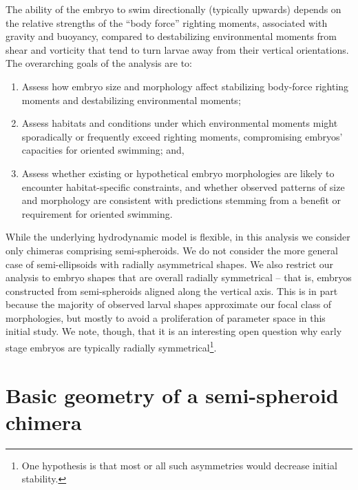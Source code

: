 \documentclass[10pt,a4paper]{article}
\begin{document}
The ability of the embryo to swim directionally (typically upwards) depends on the relative strengths of the ``body force'' righting moments, associated with gravity and buoyancy, compared to destabilizing environmental moments from shear and vorticity that tend to turn larvae away from their vertical orientations.
The overarching goals of the analysis are to:
\begin{enumerate}
	\item Assess how embryo size and morphology affect stabilizing body-force righting moments and destabilizing environmental moments; 
	\item Assess habitats and conditions under which environmental moments might sporadically or frequently exceed righting moments, compromising embryos' capacities for oriented swimming; and, 
	\item Assess whether existing or hypothetical embryo morphologies are likely to encounter habitat-specific constraints, and whether observed patterns of size and morphology are consistent with predictions stemming from a benefit or requirement for oriented swimming.
\end{enumerate}
While the underlying hydrodynamic model is flexible, in this analysis we consider only chimeras comprising semi-spheroids.
We do not consider the more general case of semi-ellipsoids with radially asymmetrical shapes.
We also restrict our analysis to embryo shapes that are overall radially symmetrical -- that is, embryos constructed from semi-spheroids aligned along the vertical axis. 
This is in part because the majority of observed larval shapes approximate our focal class of morphologies, but mostly to avoid a proliferation of parameter space in this initial study. 
We note, though, that it is an interesting open question why early stage embryos are typically radially symmetrical\footnote{One hypothesis is that most or all such asymmetries would decrease initial stability.}. 

\section{Basic geometry of a semi-spheroid chimera}\label{GeomSect}
\end{document}
